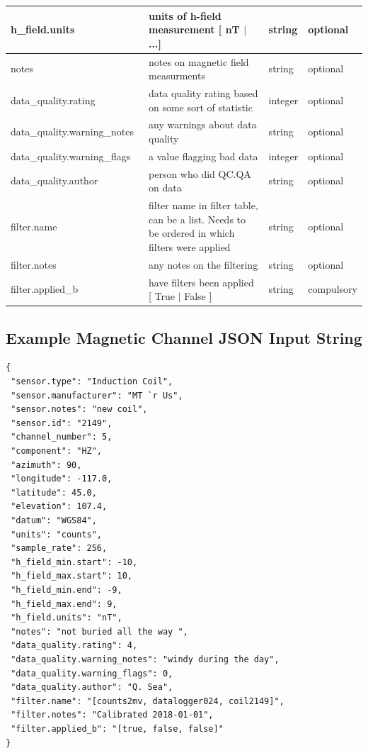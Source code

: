 \documentclass{article}
\begin{document}
\begin{table}[htb!]
\begin{tabular}{|l|p{3in}|l|l|}
        h\_field.units\ & units of h-field measurement [ nT $|$ ...] & string &   optional \\ \hline
        notes\ & notes on magnetic field measurments & string &  optional \\ \hline
        data\_quality.rating\ & data quality rating based on some sort of statistic & integer &  optional \\ \hline
        data\_quality.warning\_notes\ & any warnings about data quality & string &   optional \\ \hline
        data\_quality.warning\_flags\ & a value flagging bad data  & integer &  optional \\ \hline
        data\_quality.author\ & person who did QC.QA on data & string &   optional \\ \hline
        filter.name\ & filter name in filter table, can be a list. Needs to be ordered in which filters were applied & string &  optional \\ \hline
        filter.notes\ & any notes on the filtering & string &  optional \\ \hline
        filter.applied\_b & have filters been applied [ True $|$ False ] & string & compulsory \\ \hline
        \end{tabular}
    \label{tab:magnetic}
\end{table}

\newpage
\subsection{Example Magnetic Channel JSON Input String}

\begin{verbatim}
{
 "sensor.type": "Induction Coil",
 "sensor.manufacturer": "MT `r Us",
 "sensor.notes": "new coil",
 "sensor.id": "2149",
 "channel_number": 5,
 "component": "HZ",
 "azimuth": 90,
 "longitude": -117.0,
 "latitude": 45.0,
 "elevation": 107.4,
 "datum": "WGS84",
 "units": "counts",
 "sample_rate": 256,
 "h_field_min.start": -10,
 "h_field_max.start": 10,
 "h_field_min.end": -9,
 "h_field_max.end": 9,
 "h_field.units": "nT",
 "notes": "not buried all the way ",
 "data_quality.rating": 4,
 "data_quality.warning_notes": "windy during the day",
 "data_quality.warning_flags": 0,
 "data_quality.author": "Q. Sea",
 "filter.name": "[counts2mv, datalogger024, coil2149]",
 "filter.notes": "Calibrated 2018-01-01",
 "filter.applied_b": "[true, false, false]"
}
\end{verbatim}
\end{document}
